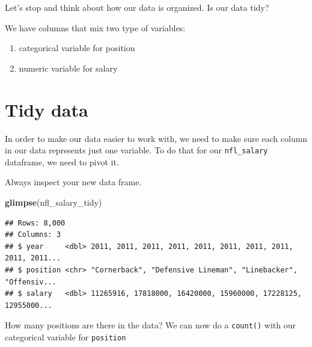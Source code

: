 \documentclass[
]{book}
\newenvironment{Shaded}{\begin{snugshade}}{\end{snugshade}}
\newcommand{\DataTypeTok}[1]{\textcolor[rgb]{0.13,0.29,0.53}{#1}}
\newcommand{\KeywordTok}[1]{\textcolor[rgb]{0.13,0.29,0.53}{\textbf{#1}}}
\newcommand{\NormalTok}[1]{#1}
\newcommand{\OperatorTok}[1]{\textcolor[rgb]{0.81,0.36,0.00}{\textbf{#1}}}
\newcommand{\StringTok}[1]{\textcolor[rgb]{0.31,0.60,0.02}{#1}}
\begin{document}
Let's stop and think about how our data is organized. Is our data tidy?

We have columns that mix two type of variables:

\begin{enumerate}
\def\labelenumi{\alph{enumi})}
\item
  categorical variable for position
\item
  numeric variable for salary
\end{enumerate}

\hypertarget{tidy-data}{%
\section{Tidy data}\label{tidy-data}}

In order to make our data easier to work with, we need to make sure each column in our data represents just one variable. To do that for our \texttt{nfl\_salary} dataframe, we need to pivot it.

\begin{Shaded}
\end{Shaded}

Always inspect your new data frame.

\begin{Shaded}
\begin{Highlighting}[]
\KeywordTok{glimpse}\NormalTok{(nfl_salary_tidy)}
\end{Highlighting}
\end{Shaded}

\begin{verbatim}
## Rows: 8,000
## Columns: 3
## $ year     <dbl> 2011, 2011, 2011, 2011, 2011, 2011, 2011, 2011, 2011, 2011...
## $ position <chr> "Cornerback", "Defensive Lineman", "Linebacker", "Offensiv...
## $ salary   <dbl> 11265916, 17818000, 16420000, 15960000, 17228125, 12955000...
\end{verbatim}

How many positions are there in the data? We can now do a \texttt{count()} with our categorical variable for \texttt{position}
\end{document}
